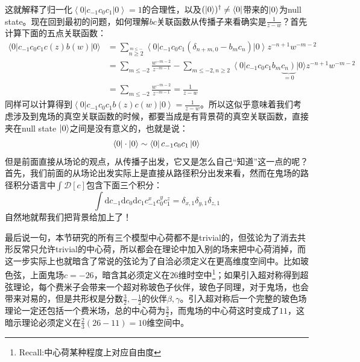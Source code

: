 这就解释了归一化$\left\langle0\right|c_{-1}c_0c_1\left|0\right\rangle=1$的合理性，以及$(\ket{0})^\dagger\neq\bra{0}$带来的$\ket{0}$为null state。现在回到最初的问题，如何理解$bc$关联函数从传播子来看确实是$\frac1{z-w}$？首先计算下面的五点关联函数：
\begin{equation}
	\begin{aligned}
		\langle0|c_{-1}c_0c_1c(z)b(w)|0\rangle &=\sum_{\overset{m\leq-}{n\geq2}}\left\langle0\right|c_{-1}c_0c_1(\delta_{n+m,0}-b_mc_n)\left|0\right\rangle z^{-n+1}w^{-m-2}\\
		&=\sum_{m\leq-2}\left.\frac{w^{-m-2}}{z^{-m-1}}-\sum_{m\leq-2,n\geq2}\left<0\right|c_{-1}c_0c_1b_m\underbrace{\left.c_n\right)}_{=0}|0\rangle z^{-n+1}w^{-m-2}\right.  \\
		&=\sum_{m\leq-2}\frac{w^{-m-2}}{z^{-m-1}}=\frac1{z-w}
	\end{aligned}
\end{equation}
同样可以计算得到$\left<0\right|c_{-1}c_0c_1b(z)c(w)\left|0\right>=\frac1{z-w}$。所以这似乎意味着我们考虑涉及到鬼场的真空关联函数的时候，都要当成是有背景荷的真空关联函数，直接夹在null state $\ket{0}$之间是没有意义的，也就是说：
\begin{equation}
	\bra{0}\cdot\ket{0}\sim\bra{0}c_{-1}c_0c_1\ket{0}
\end{equation}
但是前面直接从场论的观点，从传播子出发，它又是怎么自己“知道”这一点的呢？首先，我们前面的从场论出发实际上是直接从路径积分出发来看，然而在鬼场的路径积分语言中$\int\mathcal{D}[c]$包含下面三个积分：
\begin{equation}
	\int\mathrm{d}c_{-1}\mathrm{d}c_0\mathrm{d}c_1c_{-1}^xc_0^yc_1^z=\delta_{x,1}\delta_{y,1}\delta_{z,1}
\end{equation}
自然地就帮我们把背景给加上了！
\begin{remark}
	最后说一句，本节研究的所有三个模型中心荷都不是trivial的，但弦论为了消去共形反常只允许trivial的中心荷，所以都会在理论中加入别的场来把中心荷消掉，而这一步实际上也就暗含了常说的弦论为了自洽必须定义在更高维度空间中。比如玻色弦，上面鬼场$c=-26$，暗含其必须定义在$26$维时空中\footnote{Recall:中心荷某种程度上对应自由度}；如果引入超对称得到超弦理论，每个费米子会带来一个超对称玻色子伙伴，玻色子同理，对于鬼场，也会带来对易的，但是共形权是分数$\frac32,-\frac12$的伙伴$\beta,\gamma$。引入超对称后一个完整的玻色场理论一定还包括一个费米场，总的中心荷为$\frac32$，而鬼场的中心荷这时变成了$11$，这暗示理论必须定义在$\frac{2}{3}(26-11)=10$维空间中。
\end{remark}

